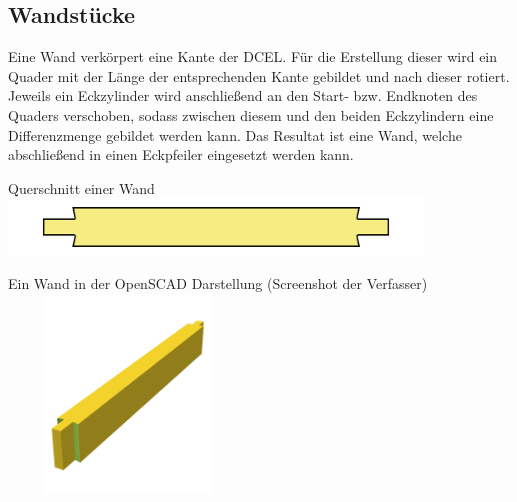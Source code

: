 \subsection{Wandstücke}
Eine Wand verkörpert eine Kante der DCEL.
Für die Erstellung dieser wird ein Quader mit der Länge der entsprechenden Kante gebildet und nach dieser rotiert.
Jeweils ein Eckzylinder wird anschließend an den Start- bzw. Endknoten des Quaders verschoben, sodass zwischen diesem und den beiden Eckzylindern eine Differenzmenge gebildet werden kann.
Das Resultat ist eine Wand, welche abschließend in einen Eckpfeiler eingesetzt werden kann. 
\begin{Bild}{Querschnitt einer Wand}
	\includegraphics[width = 110mm]{Bilder/Wand2D-04}
\end{Bild}
\begin{Bild}{Ein Wand in der OpenSCAD Darstellung (Screenshot der Verfasser)}
	\includegraphics[height=200px, width=240px]{Bilder/Untereinheit_Wand}
\end{Bild}



